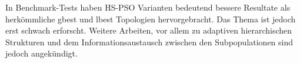 In Benchmark-Tests haben HS-PSO Varianten bedeutend bessere Resultate als herkömmliche gbest und lbest Topologien hervorgebracht. Das Thema ist jedoch erst schwach erforscht. Weitere Arbeiten, vor allem zu adaptiven hierarchischen Strukturen und dem Informationsaustausch zwischen den Subpopulationen sind jedoch angekündigt.

